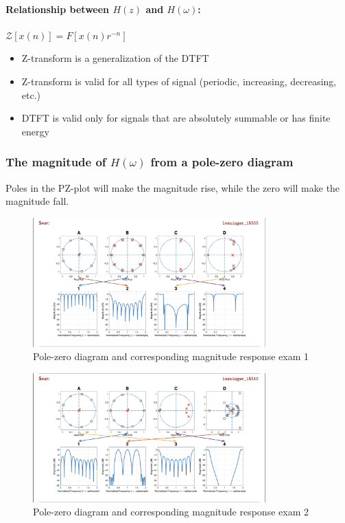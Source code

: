 \documentclass{article}
\begin{document}
\paragraph{Relationship between $H(z)$ and $H(\omega)$:} $\mathcal{Z}[x(n)] = F[x(n)r^{-n}]$
\begin{itemize}
    \item Z-transform is a generalization of the DTFT
    \item Z-transform is valid for all types of signal (periodic, increasing, decreasing, etc.)
    \item DTFT is valid only for signals that are absolutely summable or has finite energy
\end{itemize}

\clearpage
\subsubsection{The magnitude of $H(\omega)$ from a pole-zero diagram}
Poles in the PZ-plot will make the magnitude rise, while the zero will make the magnitude fall. 
\begin{figure}[h!]
    \centering
    \includegraphics[width=0.8\textwidth]{figures/Z-transform/PZ_magnitude_exam1.png}
    \caption{Pole-zero diagram and corresponding magnitude response exam 1}
    \label{fig:pole_zero_diagram_exam1}
\end{figure}
\begin{figure}[h!]
    \centering
    \includegraphics[width=0.8\textwidth]{figures/Z-transform/PZ_magnitude_exam2.png}
    \caption{Pole-zero diagram and corresponding magnitude response exam 2}
    \label{fig:pole_zero_diagram_exam2}
\end{figure}
\end{document}
